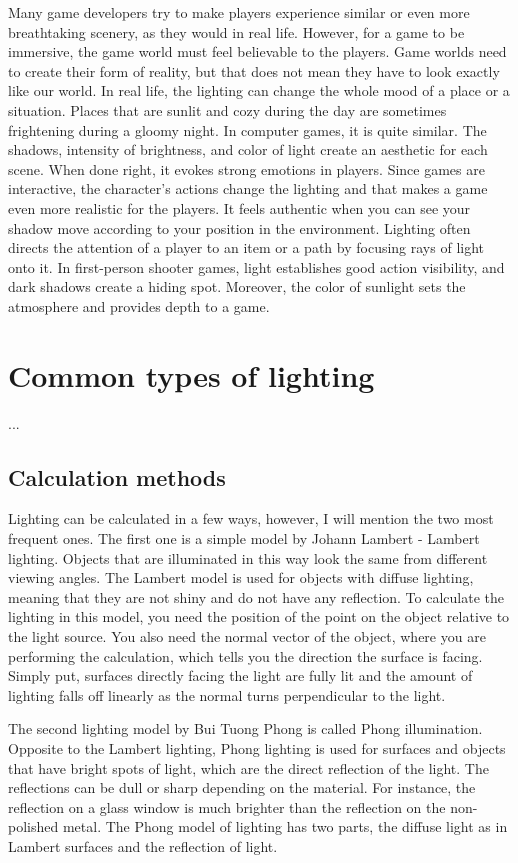\documentclass[10pt,twoside,english,a4paper]{article}
\begin{document}
Many game developers try to make players experience similar or even more breathtaking scenery, as they would in real life. However, for a game to be immersive, the game world must feel believable to the players. Game worlds need to create their form of reality, but that does not mean they have to look exactly like our world. \cite{Oudshoorn:Ray-Tracing} In real life, the lighting can change the whole mood of a place or a situation. Places that are sunlit and cozy during the day are sometimes frightening during a gloomy night. In computer games, it is quite similar. The shadows, intensity of brightness, and color of light create an aesthetic for each scene. When done right, it evokes strong emotions in players. Since games are interactive, the character's actions change the lighting and that makes a game even more realistic for the players. It feels authentic when you can see your shadow move according to your position in the environment. \cite{Pluralsight} Lighting often directs the attention of a player to an item or a path by focusing rays of light onto it. In first-person shooter games, light establishes good action visibility, and dark shadows create a hiding spot. Moreover, the color of sunlight sets the atmosphere and provides depth to a game. \cite{El-Nasr}


\section{Common types of lighting} \label{third}
...
\subsection{Calculation methods} \label{calculation}
Lighting can be calculated in a few ways, however, I will mention the two most frequent ones. The first one is a simple model by Johann Lambert - Lambert lighting. Objects that are illuminated in this way look the same from different viewing angles. The Lambert model is used for objects with diffuse lighting, meaning that they are not shiny and do not have any reflection. To calculate the lighting in this model, you need the position of the point on the object relative to the light source. You also need the normal vector of the object, where you are performing the calculation, which tells you the direction the surface is facing. Simply put, surfaces directly facing the light are fully lit and the amount of lighting falls off linearly as the normal turns perpendicular to the light.

The second lighting model by Bui Tuong Phong is called Phong illumination. Opposite to the Lambert lighting, Phong lighting is used for surfaces and objects that have bright spots of light, which are the direct reflection of the light. The reflections can be dull or sharp depending on the material. For instance, the reflection on a glass window is much brighter than the reflection on the non-polished metal. The Phong model of lighting has two parts, the diffuse light as in Lambert surfaces and the reflection of light. \cite{Prall}
\end{document}
